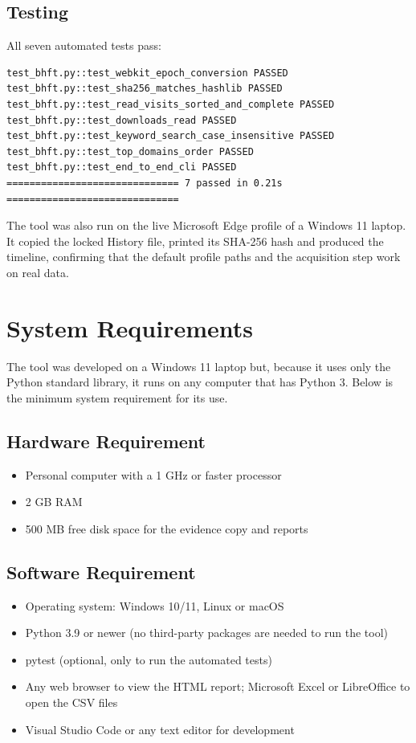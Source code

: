 \documentclass[12pt,a4paper]{article}
\begin{document}
\subsection*{Testing}
All seven automated tests pass:
\begin{lstlisting}
test_bhft.py::test_webkit_epoch_conversion PASSED
test_bhft.py::test_sha256_matches_hashlib PASSED
test_bhft.py::test_read_visits_sorted_and_complete PASSED
test_bhft.py::test_downloads_read PASSED
test_bhft.py::test_keyword_search_case_insensitive PASSED
test_bhft.py::test_top_domains_order PASSED
test_bhft.py::test_end_to_end_cli PASSED
============================== 7 passed in 0.21s ==============================
\end{lstlisting}
The tool was also run on the live Microsoft Edge profile of a Windows 11 laptop. It copied the locked History file, printed its SHA-256 hash and produced the timeline, confirming that the default profile paths and the acquisition step work on real data.

\newpage
\section*{System Requirements}\label{sec:req}
The tool was developed on a Windows 11 laptop but, because it uses only the Python standard library, it runs on any computer that has Python 3. Below is the minimum system requirement for its use.

\subsection*{Hardware Requirement}
\begin{itemize}[nosep]
  \item Personal computer with a 1 GHz or faster processor
  \item 2 GB RAM
  \item 500 MB free disk space for the evidence copy and reports
\end{itemize}

\subsection*{Software Requirement}
\begin{itemize}[nosep]
  \item Operating system: Windows 10/11, Linux or macOS
  \item Python 3.9 or newer (no third-party packages are needed to run the tool)
  \item pytest (optional, only to run the automated tests)
  \item Any web browser to view the HTML report; Microsoft Excel or LibreOffice to open the CSV files
  \item Visual Studio Code or any text editor for development
\end{itemize}
\end{document}
